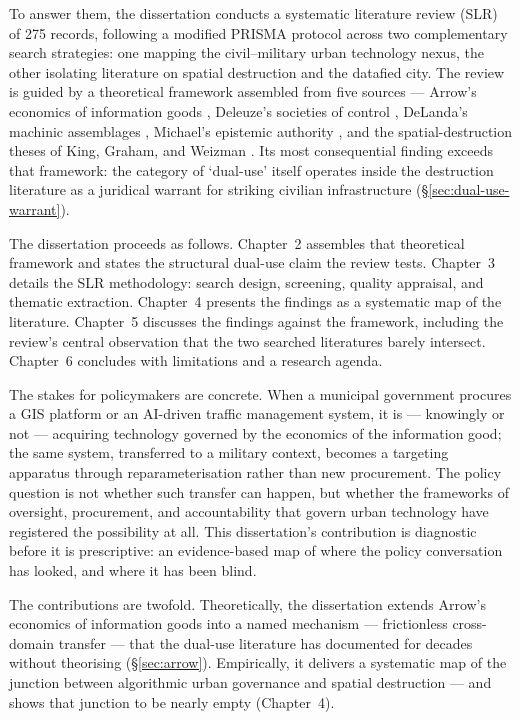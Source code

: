 \documentclass[12pt,a4paper,twoside]{report}
\begin{document}
To answer them, the dissertation conducts a systematic literature review (SLR) of 275 records, following a modified PRISMA protocol \parencite{page2021} across two complementary search strategies: one mapping the civil–military urban technology nexus, the other isolating literature on spatial destruction and the datafied city. The review is guided by a theoretical framework assembled from five sources — Arrow's economics of information goods \citeyearpar{arrow1962}, Deleuze's societies of control \citeyearpar{deleuze1990}, DeLanda's machinic assemblages \citeyearpar{delanda1992,delanda2014}, Michael's epistemic authority \citeyearpar{michael2007}, and the spatial-destruction theses of King, Graham, and Weizman \citeyearpar{king2004,graham2006,weizman2007}. Its most consequential finding exceeds that framework: the category of `dual-use' itself operates inside the destruction literature as a juridical warrant for striking civilian infrastructure (§\ref{sec:dual-use-warrant}).

The dissertation proceeds as follows. Chapter~2 assembles that theoretical framework and states the structural dual-use claim the review tests. Chapter~3 details the SLR methodology: search design, screening, quality appraisal, and thematic extraction. Chapter~4 presents the findings as a systematic map of the literature. Chapter~5 discusses the findings against the framework, including the review's central observation that the two searched literatures barely intersect. Chapter~6 concludes with limitations and a research agenda.

The stakes for policymakers are concrete. When a municipal government procures a GIS platform or an AI-driven traffic management system, it is — knowingly or not — acquiring technology governed by the economics of the information good; the same system, transferred to a military context, becomes a targeting apparatus through reparameterisation rather than new procurement. The policy question is not whether such transfer can happen, but whether the frameworks of oversight, procurement, and accountability that govern urban technology have registered the possibility at all. This dissertation's contribution is diagnostic before it is prescriptive: an evidence-based map of where the policy conversation has looked, and where it has been blind.

The contributions are twofold. Theoretically, the dissertation extends Arrow's economics of information goods into a named mechanism — frictionless cross-domain transfer — that the dual-use literature has documented for decades without theorising (§\ref{sec:arrow}). Empirically, it delivers a systematic map of the junction between algorithmic urban governance and spatial destruction — and shows that junction to be nearly empty (Chapter~4).
\end{document}
